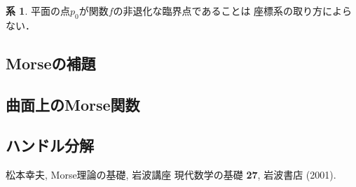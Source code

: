 \documentclass[11pt, a4paper, dvipdfmx]{jsarticle}
\theoremstyle{definition}
\theoremstyle{mystyle}
\newtheorem{CRL}[Axiom]{系}
\numberwithin{equation}{section} %
\begin{document}
\begin{CRL}
    平面の点$p_0$が関数$f$の非退化な臨界点であることは
    座標系の取り方によらない．
\end{CRL}

\subsection{Morseの補題}
\subsection{曲面上のMorse関数}
\subsection{ハンドル分解}






\begin{thebibliography}{15}

 松本幸夫, Morse理論の基礎, 岩波講座 現代数学の基礎 {\bf 27}, 岩波書店 (2001).

\end{thebibliography}
\end{document}
